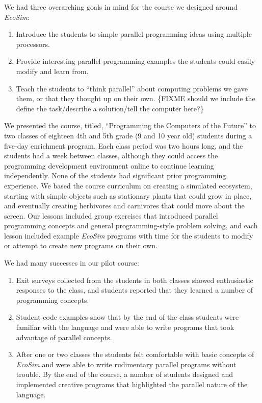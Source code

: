\documentclass{sig-alternate}
\newcommand{\FIXME}[1]{{\color{red}\{FIXME #1\}}}
\begin{document}
We had three overarching goals in mind for the course we designed around \emph{EcoSim}:
\begin{enumerate}
\item Introduce the students to simple parallel programming ideas using multiple processors.
\item Provide interesting parallel programming examples the students could easily modify and
learn from.
\item Teach the students to ``think parallel'' about computing problems we gave them, or that
they thought up on their own.
\FIXME{should we include the define the task/describe a solution/tell the computer here?}
\end{enumerate}

We presented the course, titled, ``Programming the Computers of the Future'' to two classes of 
eighteen 4th and 5th grade (9 and 10 year old) students during a five-day enrichment program.
Each class period was two hours long, and the students had a week between classes, although they
could access the programming development environment online to continue learning independently.
None of the students had significant prior programming experience.
We based the course curriculum on creating a simulated ecosystem, starting with simple objects
such as stationary plants that could grow in place, and eventually creating herbivores and
carnivores that could move about the screen.
Our lessons included group exercises that introduced parallel programming concepts and general
programming-style problem solving, and each lesson included example \emph{EcoSim} programs with
time for the students to modify or attempt to create new programs on their own.

We had many successes in our pilot course:

\begin{enumerate}
\item Exit surveys collected from the students in both classes showed enthusiastic responses to the
class, and students reported that they learned a number of programming concepts.
\item Student code examples show that by the end of the class students were familiar with the
language and were able to write programs that took advantage of parallel concepts.
\item After one or two classes the students
felt comfortable with basic concepts of \emph{EcoSim} and were able to write rudimentary
parallel programs without trouble.  By the end of the course, a number of students designed
and implemented creative programs that highlighted the parallel nature of the language.
\end{enumerate}
\end{document}
